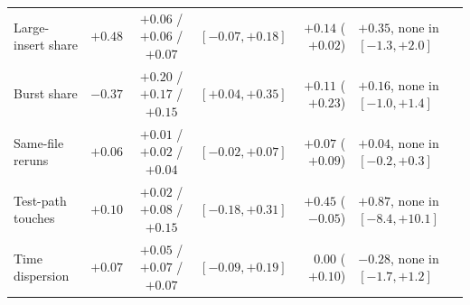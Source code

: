 \begin{table}
\begin{tabular}{@{}l r c c r l@{}}
Large-insert share & $+0.48$ & $+0.06$ / $+0.06$ / $+0.07$ & $[-0.07, +0.18]$ & $+0.14$ ($+0.02$) & $+0.35$, none in $[-1.3, +2.0]$ \\
Burst share & $-0.37$ & $+0.20$ / $+0.17$ / $+0.15$ & $[+0.04, +0.35]$ & $+0.11$ ($+0.23$) & $+0.16$, none in $[-1.0, +1.4]$ \\
Same-file reruns & $+0.06$ & $+0.01$ / $+0.02$ / $+0.04$ & $[-0.02, +0.07]$ & $+0.07$ ($+0.09$) & $+0.04$, none in $[-0.2, +0.3]$ \\
Test-path touches & $+0.10$ & $+0.02$ / $+0.08$ / $+0.15$ & $[-0.18, +0.31]$ & $+0.45$ ($-0.05$) & $+0.87$, none in $[-8.4, +10.1]$ \\
Time dispersion & $+0.07$ & $+0.05$ / $+0.07$ / $+0.07$ & $[-0.09, +0.19]$ & $0.00$ ($+0.10$) & $-0.28$, none in $[-1.7, +1.2]$ \\
\bottomrule
\end{tabular}
\end{table}
